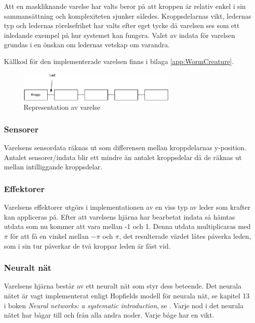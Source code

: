 \documentclass[titlepage, twocolumn, a4paper, 11pt, swedish]{article}
\begin{document}
 Att en maskliknande varelse har valts beror på att kroppen är relativ enkel i sin sammansättning och komplexiteten sjunker således. Kroppsdelarnas vikt, ledernas typ och ledernas rörelsefrihet har valts efter eget tycke då varelsen ses som ett inledande exempel på hur systemet kan fungera. Valet av indata för varelsen grundas i en önskan om ledernas vetskap om varandra.

 Källkod för den implementerade varelsen finns i bilaga \vref{app:WormCreature}.

\begin{figure}
  \begin{center}
    \includegraphics[width=78mm]{images/creature.pdf}
    \caption{Representation av varelse}
    \label{fig:creature.pdf}
  \end{center}
\end{figure}

\subsubsection{Sensorer}
Varelsens sensordata räknas ut som differensen mellan kroppdelarnas y-position. Antalet sensorer/indata blir ett mindre än antalet kroppsdelar då de räknas ut mellan intilliggande kroppsdelar. 

\subsubsection{Effektorer}
Varelsens effektorer utgörs i implementationen av en viss typ av leder som krafter kan appliceras på. Efter att varelsens hjärna har bearbetat indata så hämtas utdata som nu kommer att vara mellan -1 och 1. Denna utdata multiplicaras med $\pi$ för att få en vinkel mellan $-\pi$ och $\pi$, det resulterade värdet låtes påverka leden, som i sin tur påverkar de två kroppar leden är fäst vid.

\subsubsection{Neuralt nät}
Varelsens hjärna består av ett neuralt nät som styr dess beteende. Det neurala nätet är vagt implementerat enligt Hopfields modell för neurala nät, se kapitel 13 i boken \textit{Neural networks: a systematic introduction}, se \cite{raul}. Varje nod i det neurala nätet har bågar till och från alla andra noder. Varje båge har en vikt.
\end{document}

